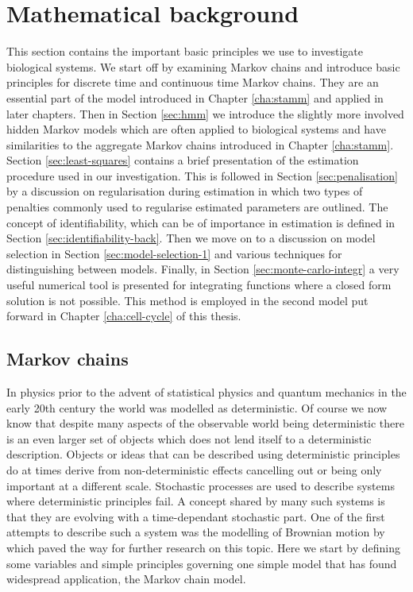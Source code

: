 
\section{Mathematical background}
\label{sec:math-backgr}

This section contains the important basic principles we use to investigate biological systems. We start off by examining Markov chains and introduce basic principles for discrete time and continuous time Markov chains. They  are an essential part of the model introduced in Chapter \ref{cha:stamm} and applied in later chapters. Then in Section \ref{sec:hmm} we introduce the slightly more involved hidden Markov models which are often applied to biological systems and have similarities to the aggregate Markov chains introduced in Chapter \ref{cha:stamm}. Section \ref{sec:least-squares} contains a brief presentation of the estimation procedure used in our investigation. This is followed in Section \ref{sec:penalisation} by a discussion on regularisation during estimation in which two types of penalties commonly used to regularise estimated parameters are outlined. The concept of identifiability, which can be of importance in estimation is defined in Section \ref{sec:identifiability-back}. Then we move on to a discussion on model selection in Section \ref{sec:model-selection-1} and various techniques for distinguishing between models. Finally, in Section \ref{sec:monte-carlo-integr} a very useful numerical tool is presented for integrating functions where a closed form solution is not possible. This method is employed in the second model put forward in Chapter \ref{cha:cell-cycle} of this thesis.

\subsection{Markov chains}
\label{sec:markov-chains}

In physics prior to the advent of statistical physics and quantum mechanics in the early 20th century the world was modelled as deterministic. Of course we now know that despite many aspects of the observable world being deterministic there is an even larger set of objects which does not lend itself to a deterministic description. Objects or ideas that can be described using deterministic principles do at times derive from non-deterministic effects cancelling out or being only important at a different scale. Stochastic processes are used to describe systems where deterministic principles fail. A concept shared by many such systems is that they are evolving with a time-dependant stochastic part. One of the first attempts to describe such a system was the modelling of Brownian motion by \cite{Einstein:2005ww} which paved the way for further research on this topic. Here we start by defining some variables and simple principles governing one simple model that has found widespread application, the Markov chain model.

